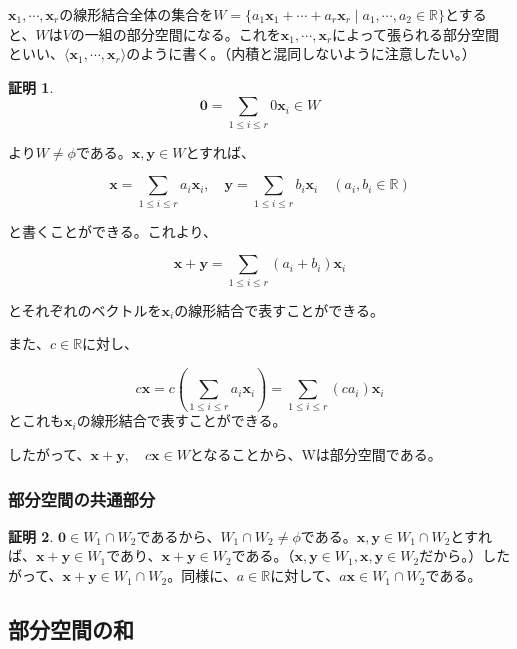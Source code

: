 \documentclass[dvipdfmx,autodetect-engine]{jsarticle}
\theoremstyle{definition}
\newtheorem*{Proof*}{証明}
\begin{document}
$\bm{x}_1, \cdots, \bm{x}_r$の線形結合全体の集合を$W = \{a_1\bm{x}_1 + \cdots + a_r\bm{x}_r \mid a_1, \cdots, a_2 \in \mathbb{R} \}$とすると、$W$は$V$の一組の部分空間になる。これを$\bm{x}_1, \cdots, \bm{x}_r$によって張られる部分空間といい、$\langle \bm{x}_1, \cdots, \bm{x}_r \rangle$のように書く。（内積と混同しないように注意したい。）

\begin{Proof*}
$$
\bm{0} = \sum_{1 \leq i \leq r} 0\bm{x}_i \in W
$$

より$W \neq \phi$である。$\bm{x}, \bm{y} \in W$とすれば、

$$
\bm{x} = \sum_{1 \leq i \leq r} a_i\bm{x}_i, \quad \bm{y} = \sum_{1 \leq i \leq r} b_i\bm{x}_i \quad (a_i, b_i \in \mathbb{R})
$$

と書くことができる。これより、

$$
\bm{x} + \bm{y} = \sum_{1 \leq i \leq r} (a_i + b_i)\bm{x}_i
$$

とそれぞれのベクトルを$\bm{x}_i$の線形結合で表すことができる。

また、$c \in \mathbb{R}$に対し、

$$
c\bm{x} = c \left( \sum_{1 \leq i \leq r} a_i\bm{x}_i \right) = \sum_{1 \leq i \leq r} (ca_i)\bm{x}_i
$$とこれも$\bm{x}_i$の線形結合で表すことができる。

したがって、$\bm{x} + \bm{y}, \quad c\bm{x} \in W$となることから、Wは部分空間である。
\end{Proof*}

\subsubsection{部分空間の共通部分}


\begin{Proof*}
$\bm{0} \in W_1 \cap W_2$であるから、$W_1 \cap W_2 \neq \phi$である。$\bm{x}, \bm{y} \in W_1 \cap W_2$とすれば、$\bm{x} + \bm{y} \in W_1$であり、$\bm{x} + \bm{y} \in W_2$である。（$\bm{x}, \bm{y} \in W_1, \bm{x}, \bm{y} \in W_2$だから。）したがって、$\bm{x} + \bm{y} \in W_1 \cap W_2$。同様に、$a \in \mathbb{R}$に対して、$a\bm{x} \in W_1 \cap W_2$である。
\end{Proof*}

\subsection{部分空間の和}
\end{document}
